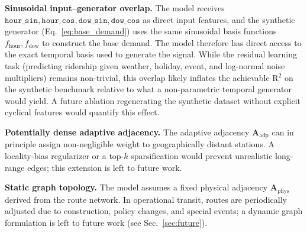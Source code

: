 \textbf{Sinusoidal input--generator overlap.} The model receives $\texttt{hour\_sin}, \texttt{hour\_cos}, \texttt{dow\_sin}, \texttt{dow\_cos}$ as direct input features, and the synthetic generator (Eq.~\ref{eq:base_demand}) uses the same sinusoidal basis functions $f_{\text{hour}}, f_{\text{dow}}$ to construct the base demand. The model therefore has direct access to the exact temporal basis used to generate the signal. While the residual learning task (predicting ridership given weather, holiday, event, and log-normal noise multipliers) remains non-trivial, this overlap likely inflates the achievable R$^2$ on the synthetic benchmark relative to what a non-parametric temporal generator would yield. A future ablation regenerating the synthetic dataset without explicit cyclical features would quantify this effect.

\textbf{Potentially dense adaptive adjacency.} The adaptive adjacency $\mathbf{A}_{\text{adp}}$ can in principle assign non-negligible weight to geographically distant stations. A locality-bias regularizer or a top-$k$ sparsification would prevent unrealistic long-range edges; this extension is left to future work.

\textbf{Static graph topology.} The model assumes a fixed physical adjacency $\mathbf{A}_{\text{phys}}$ derived from the route network. In operational transit, routes are periodically adjusted due to construction, policy changes, and special events; a dynamic graph formulation is left to future work (see Sec.~\ref{sec:future}).

